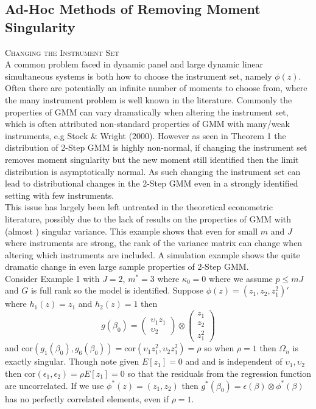 \documentclass[11pt, fleqn]{article}
\begin{document}
\subsection{Ad-Hoc Methods of Removing Moment Singularity}

\textsc{Changing the  Instrument Set}\\

A common problem faced in dynamic panel and large dynamic  linear simultaneous systems is both how to choose the instrument set, namely $\phi(z)$. Often there are potentially an infinite number of moments to choose from, where the many instrument problem is well known in the literature. Commonly the properties of GMM  can vary dramatically when altering the instrument set, which is often attributed non-standard properties of GMM with many/weak instruments, e.g Stock \& Wright (2000). However as seen in Theorem 1 the distribution of 2-Step GMM is highly non-normal, if changing the instrument set removes moment singularity but the new moment still identified then the limit distribution is asymptotically normal.  As such changing the instrument set can lead to distributional changes in the 2-Step GMM even in a strongly identified setting with few instruments.\\
 This issue has largely been left untreated in the theoretical econometric literature, possibly due to the lack of results on the properties of GMM with  (almost ) singular variance. This example shows that even for small $m$ and $J$ where instruments are strong, the rank of the variance matrix can change when altering which instruments are included. A simulation example shows the quite dramatic change in even large sample properties of 2-Step GMM.\\
Consider Example 1 with $J=2$, $m^*=3$ where $\kappa_0=0$ where we assume $p\leq mJ$ and $G$ is full rank so the model is identified. Suppose $\phi(z)=(z_1,z_2,z_1^2)'$ where $h_1(z)=z_1$ and $h_2(z)=1$ then
\begin{equation} g(\beta_0)=\left(\begin{array}{c}\upsilon_1z_1 \\ \upsilon_2 \end{array} \right) \otimes \left(\begin{array}{c} z_1 \\ z_2 \\ z_1^2 \end{array} \right) \end{equation}
 and $\textrm{cor} (g_1(\beta_0), g_6(\beta_0))=\textrm{cor} (\upsilon_1 z_1^2,\upsilon_2 z_1^2)=\rho$ so when $\rho=1$ then $\Omega_n$ is exactly singular. Though note given $E[z_1]=0$ and and is independent of $\upsilon_1,\upsilon_2$ then $\textrm{cor}(\epsilon_1,\epsilon_2)=\rho E[z_1]=0$ so that the residuals from the regression function are uncorrelated. If we use $\phi^*(z)=(z_1,z_2)$ then $g^*(\beta_0)=\epsilon(\beta)\otimes \phi^*(\beta)$ has no perfectly correlated elements, even if $\rho=1$.\\
\end{document}
